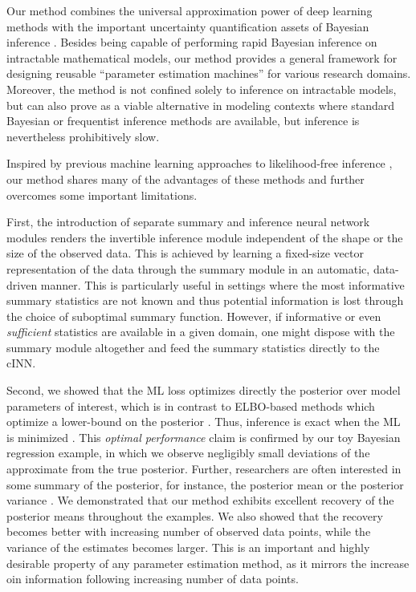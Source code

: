 \documentclass[9pt,twoside,lineno]{pnas-new}
\begin{document}
Our method combines the universal approximation power of deep learning methods with the important uncertainty quantification assets of Bayesian inference \cite{kendall2017uncertainties, gelman2013bayesian}. Besides being capable of performing rapid Bayesian inference on intractable mathematical models, our method provides a general framework for designing reusable “parameter estimation machines” for various research domains. Moreover, the method is not confined solely to inference on intractable models, but can also prove as a viable alternative in modeling contexts where standard Bayesian or frequentist inference methods are available, but inference is nevertheless prohibitively slow. 

Inspired by previous machine learning approaches to likelihood-free inference \cite{radev2019towards, hwang2018conditional, mestdagh2018prepaid, raynal2018abc, jiang2017learning, lueckmann2017flexible, papamakarios2016fast}, our method shares many of the advantages of these methods and further overcomes some important limitations. 

First, the introduction of separate summary and inference neural network modules renders the invertible inference module independent of the shape or the size of the observed data. This is achieved by learning a fixed-size vector representation of the data through the summary module in an automatic, data-driven manner. This is particularly useful in settings where the most informative summary statistics are not known and thus potential information is lost through the choice of suboptimal summary function. However, if informative or even \textit{sufficient} statistics are available in a given domain, one might dispose with the summary module altogether and feed the summary statistics directly to the cINN. 

Second, we showed that the ML loss optimizes directly the posterior over model parameters of interest, which is in contrast to ELBO-based methods which optimize a lower-bound on the posterior \cite{papamakarios2016fast, kingma2014auto}. Thus, inference is exact when the ML is minimized \cite{kingma2018glow, dinh2016density}. This \textit{optimal performance} claim is confirmed by our toy Bayesian regression example, in which we observe negligibly small deviations of the approximate from the true posterior. Further, researchers are often interested in some summary of the posterior, for instance, the posterior mean or the posterior variance \cite{radev2019towards, raynal2018abc}. We demonstrated that our method exhibits excellent recovery of the posterior means throughout the examples. We also showed that the recovery becomes better with increasing number of observed data points, while the variance of the estimates becomes larger. This is an important and highly desirable property of any parameter estimation method, as it mirrors the increase oin information following increasing number of data points. 
\end{document}
